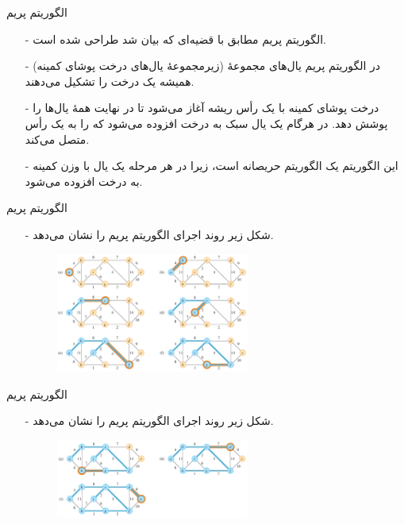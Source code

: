 
\begin{frame}{‌الگوریتم پریم}
\begin{itemize}\itemr
\item[-]
الگوریتم پریم مطابق با قضیه‌ای که بیان شد طراحی شده است.
\item[-]
در الگوریتم پریم
 یال‌های مجموعهٔ
(زیرمجموعهٔ یال‌های درخت پوشای کمینه)
همیشه یک درخت را تشکیل می‌دهند.
\item[-]
درخت پوشای کمینه با یک رأس ریشه
آغاز می‌شود تا در نهایت همهٔ یال‌ها
را پوشش دهد. در هرگام یک یال سبک به درخت
افزوده می‌شود که
را به یک رأس متصل می‌کند.
\item[-]
این الگوریتم یک الگوریتم حریصانه است، زیرا در هر مرحله یک یال با وزن کمینه به درخت افزوده می‌شود.
\end{itemize}
\end{frame}


\begin{frame}{‌الگوریتم پریم}
\begin{itemize}\itemr
\item[-]
شکل زیر روند اجرای الگوریتم پریم را نشان می‌دهد.
\begin{figure}
\includegraphics[width=0.6\textwidth]{figs/chap07/595-prim-1}
\end{figure}
\end{itemize}
\end{frame}

\begin{frame}{‌الگوریتم پریم}
\begin{itemize}\itemr
\item[-]
شکل زیر روند اجرای الگوریتم پریم را نشان می‌دهد.
\begin{figure}
\includegraphics[width=0.6\textwidth]{figs/chap07/595-prim-2}
\end{figure}
\end{itemize}
\end{frame}

